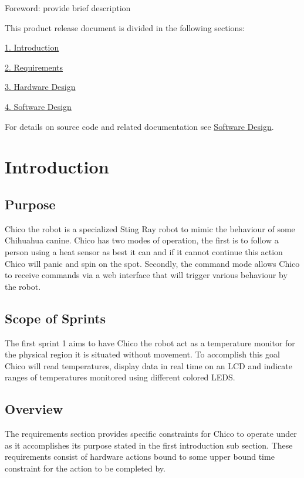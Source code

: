 Foreword\+: provide brief description

This product release document is divided in the following sections\+:
\begin{DoxyItemize}
\item \hyperlink{introduction}{1. Introduction}
\item \hyperlink{requirements}{2. Requirements}
\item \hyperlink{hardware_design}{3. Hardware Design}
\item \hyperlink{software_design}{4. Software Design}
\end{DoxyItemize}

For details on source code and related documentation see \hyperlink{software_design}{Software Design}. \hypertarget{introduction}{}\section{Introduction}\label{introduction}
\hypertarget{introduction_purpose}{}\subsection{Purpose}\label{introduction_purpose}
Chico the robot is a specialized Sting Ray robot to mimic the behaviour of some Chihuahua canine. Chico has two modes of operation, the first is to follow a person using a heat sensor as best it can and if it cannot continue this action Chico will panic and spin on the spot. Secondly, the command mode allows Chico to receive commands via a web interface that will trigger various behaviour by the robot.\hypertarget{introduction_scope}{}\subsection{Scope of Sprints}\label{introduction_scope}
The first sprint 1 aims to have Chico the robot act as a temperature monitor for the physical region it is situated without movement. To accomplish this goal Chico will read temperatures, display data in real time on an L\+CD and indicate ranges of temperatures monitored using different colored L\+E\+DS.\hypertarget{introduction_overview}{}\subsection{Overview}\label{introduction_overview}
The requirements section provides specific constraints for Chico to operate under as it accomplishes its purpose stated in the first introduction sub section. These requirements consist of hardware actions bound to some upper bound time constraint for the action to be completed by. ~\newline
